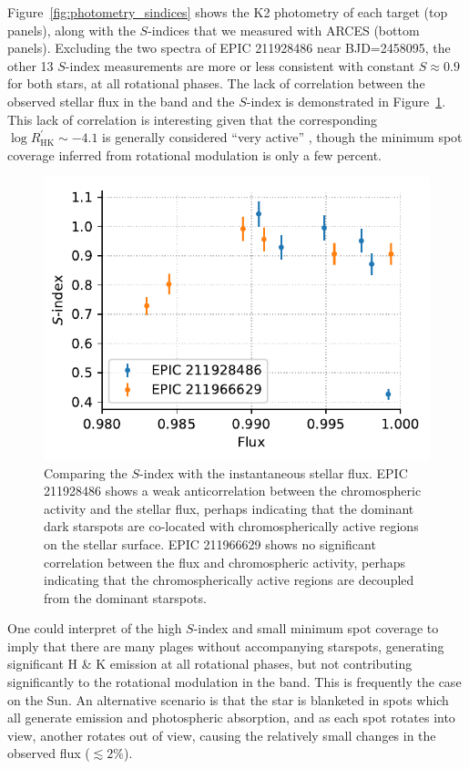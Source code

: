 Figure~\ref{fig:photometry_sindices} shows the K2 photometry of each target (top panels), along with the $S$-indices that we measured with ARCES (bottom panels). Excluding the two spectra of EPIC 211928486 near BJD=2458095, the other 13 $S$-index measurements are more or less consistent with constant $S\approx 0.9$ for both stars, at all rotational phases. The lack of correlation between the observed stellar flux in the \kepler band and the $S$-index is demonstrated in Figure~\ref{fig:sind_corr}. This lack of correlation is interesting given that the corresponding $\log R^\prime_\mathrm{HK} \sim -4.1$ is generally considered ``very active'' \citep{Wright2004}, though the minimum spot coverage inferred from rotational modulation is only a few percent. 

\begin{figure}
    \centering
    \includegraphics[scale=0.8]{nephelion/sind_flux_corr.pdf}
    \caption{Comparing the $S$-index with the instantaneous stellar flux. EPIC 211928486 shows a weak anticorrelation between the chromospheric activity and the stellar flux, perhaps indicating that the dominant dark starspots are co-located with chromospherically active regions on the stellar surface. EPIC 211966629 shows no significant correlation between the flux and chromospheric activity, perhaps indicating that the chromospherically active regions are decoupled from the dominant starspots.}
    \label{fig:sind_corr}
\end{figure}

One could interpret of the high $S$-index and small minimum spot coverage to imply that there are many plages without accompanying starspots, generating significant  H \& K emission at all rotational phases, but not contributing significantly to the rotational modulation in the \kepler band. This is frequently the case on the Sun. An alternative scenario is that the star is blanketed in spots which all generate  emission and photospheric absorption, and as each spot rotates into view, another rotates out of view, causing the relatively small changes in the observed \kepler flux ($\lesssim 2\%$). 

